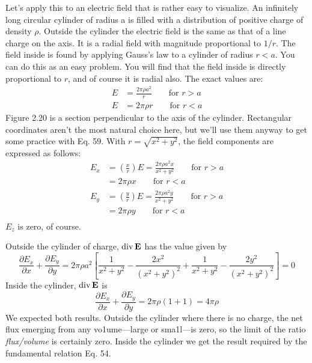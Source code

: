 Let's apply this to an electric field that is rather easy to visualize.
An infinitely long circular cylinder of radius a is filled with a distribution
of positive charge of density $\rho$. Outside the cylinder the electric
field is the same as that of a line charge on the axis. It is a radial
field with magnitude proportional to $1/r$. The field inside is found
by applying Gauss's law to a cylinder of radius $r< a$. You can do
this as an easy problem. You will find that the field inside is directly
proportional to $r$, and of course it is radial also. The exact values
are:
\begin{align}
  E &= \frac{2\pi\rho a^2}{r} \qquad \text{for $r>a$} \\
  E &= 2\pi\rho r \qquad \text{for $r<a$} 
\end{align}
Figure 2.20 is a section perpendicular to the axis of the cylinder.
Rectangular coordinates aren't the most natural choice here, but
we'll use them anyway to get some practice with Eq. 59. With
$r=\sqrt{x^2+y^2}$, the field components are expressed as follows:
\begin{align}
  E_x &= \left(\frac{x}{r}\right)E = \frac{2\pi\rho a^2 x}{x^2+y^2} \qquad \text{for $r>a$} \\
      &= 2\pi\rho x \qquad \text{for $r<a$} \\
  E_y &= \left(\frac{y}{r}\right)E = \frac{2\pi\rho a^2 y}{x^2+y^2} \qquad \text{for $r>a$} \\
      &= 2\pi\rho y \qquad \text{for $r<a$} \\
\end{align}
$E_z$ is zero, of course.

Outside the cylinder of charge, $\operatorname{div}\mathbf{E}$ has the value given by
\begin{equation}
  \frac{\partial E_x}{\partial x}+\frac{\partial E_y}{\partial y}
       = 2\pi\rho a^2\left[
           \frac{1}{x^2+y^2}-\frac{2x^2}{(x^2+y^2)^2}
                 +\frac{1}{x^2+y^2}-\frac{2y^2}{(x^2+y^2)^2}
         \right] = 0
\end{equation}
Inside the cylinder, $\operatorname{div}\mathbf{E}$ is
\begin{equation}
  \frac{\partial E_x}{\partial x}+\frac{\partial E_y}{\partial y}
        =2\pi\rho(1+1)=4\pi\rho
\end{equation}
We expected both results. Outside the cylinder where there is no
charge, the net flux emerging from any vo1ume---large or sma1l---is
zero, so the limit of the ratio \emph{flux/volume} is certainly zero. Inside the
cylinder we get the result required by the fundamental relation Eq. 54.

